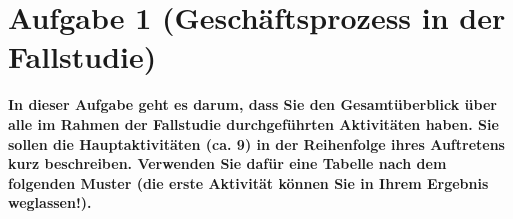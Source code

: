 \section{Aufgabe 1 (Geschäftsprozess in der Fallstudie)}
\textbf{In dieser Aufgabe geht es darum, dass Sie den Gesamtüberblick über alle im Rahmen der
Fallstudie durchgeführten Aktivitäten haben. Sie sollen die Hauptaktivitäten (ca. 9) in der
Reihenfolge ihres Auftretens kurz beschreiben. Verwenden Sie dafür eine Tabelle nach
dem folgenden Muster (die erste Aktivität  können Sie
in Ihrem Ergebnis weglassen!).} 

\clearpage
